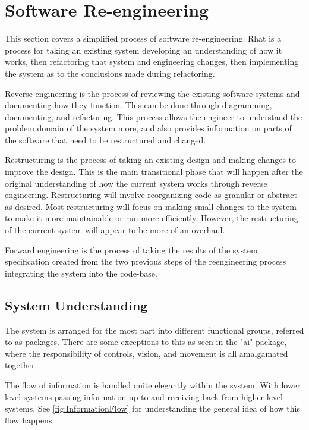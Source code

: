 \chapter{Software Re-engineering}

\label{Chapter3}

This section covers a simplified process of software re-engineering.
Rhat is a process for taking an existing system developing an understanding of how it works, then refactoring that system and engineering changes, then implementing the system as to the conclusions made during refactoring.

Reverse engineering is the process of reviewing the existing software systems and documenting how they function. This can be done through diagramming, documenting, and refactoring. This process allows the engineer to understand the problem domain of the system more, and also provides information on parts of the software that need to be restructured and changed.

Restructuring is the process of taking an existing design and making changes to improve the design. This is the main transitional phase that will happen after the original understanding of how the current system works through reverse engineering. Restructuring will involve reorganizing code as granular or abstract as desired. Most restructuring will focus on making small changes to the system to make it more maintainable or run more efficiently. However, the restructuring of the current system will appear to be more of an overhaul.

Forward engineering is the process of taking the results of the system specification created from the two previous steps of the reengineering process integrating the system into the code-base.

\section{System Understanding}

The system is arranged for the most part into different functional groups, referred to as packages. There are some exceptions to this as seen in the "ai" package, where the responsibility of controls, vision, and movement is all amalgamated together.

The flow of information is handled quite elegantly within the system.
With lower level systems passing information up to and receiving back from
higher level systems. See \ref{fig:InformationFlow} for understanding the
general idea of how this flow happens.

